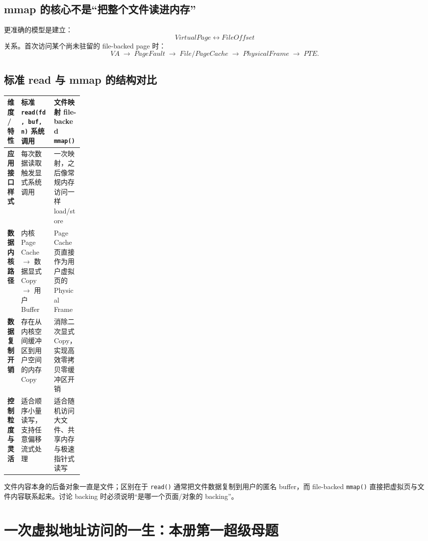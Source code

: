 \documentclass[11pt,a4paper]{ctexart}
\newcommand{\code}[1]{\texttt{#1}}
\newcommand{\arr}{\;\longrightarrow\;}
\begin{document}
\subsection{mmap 的核心不是“把整个文件读进内存”}
更准确的模型是建立：
\[
\boxed{VirtualPage \leftrightarrow FileOffset}
\]
关系。首次访问某个尚未驻留的 file-backed page 时：
\[
VA\arr PageFault\arr File/PageCache\arr PhysicalFrame\arr PTE.
\]

\subsection{标准 read 与 mmap 的结构对比}
\begingroup
\small
\renewcommand{\arraystretch}{1.25}
\setlength{\tabcolsep}{6pt}
\begin{tabularx}{\linewidth}{>{\bfseries}p{0.18\linewidth} X X}
\toprule
维度 / 特性 & 标准 \code{read(fd, buf, n)} 系统调用 & 文件映射 file-backed \code{mmap()}\\
\midrule
应用接口样式 & 每次数据读取触发显式系统调用 & 一次映射，之后像常规内存访问一样 load/store\\
数据内核路径 & 内核 Page Cache $\rightarrow$ 数据显式 Copy $\rightarrow$ 用户 Buffer & Page Cache 页直接作为用户虚拟页的 Physical Frame\\
数据复制开销 & 存在从内核空间缓冲区到用户空间的内存 Copy & 消除二次显式 Copy，实现高效零拷贝零缓冲区开销\\
控制粒度与灵活 & 适合顺序小量读写，支持任意偏移流式处理 & 适合随机访问大文件、共享内存与极速指针式读写\\
\bottomrule
\end{tabularx}
\endgroup

\begin{warn}
文件内容本身的后备对象一直是文件；区别在于 \code{read()} 通常把文件数据复制到用户的匿名 buffer，而 file-backed \code{mmap()} 直接把虚拟页与文件内容联系起来。讨论 backing 时必须说明“是哪一个页面/对象的 backing”。
\end{warn}

\section{一次虚拟地址访问的一生：本册第一超级母题}
\end{document}

